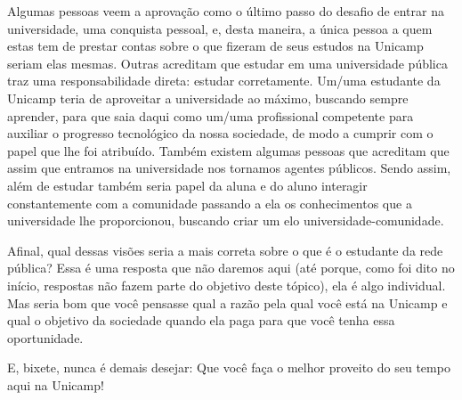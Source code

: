 Algumas pessoas veem a aprovação como o último passo do desafio de entrar na
universidade, uma conquista pessoal, e, desta maneira, a única pessoa a quem
estas tem de prestar contas sobre o que fizeram de seus estudos na Unicamp
seriam elas mesmas. Outras acreditam que estudar em uma universidade pública
traz uma responsabilidade direta: estudar corretamente. Um/uma estudante da
Unicamp teria de aproveitar a universidade ao máximo, buscando sempre aprender,
para que saia daqui como um/uma profissional competente para auxiliar o
progresso tecnológico da nossa sociedade, de modo a cumprir com o papel que lhe
foi atribuído. Também existem algumas pessoas que acreditam que assim que
entramos na universidade nos tornamos agentes públicos. Sendo assim, além de
estudar também seria papel da aluna e do aluno interagir constantemente com a
comunidade passando a ela os conhecimentos que a universidade lhe proporcionou,
buscando criar um elo universidade-comunidade.

Afinal, qual dessas visões seria a mais correta sobre o que é o estudante da
rede pública? Essa é uma resposta que não daremos aqui (até porque, como foi
dito no início, respostas não fazem parte do objetivo deste tópico), ela é algo
individual. Mas seria bom que você pensasse qual a razão pela qual você está na
Unicamp e qual o objetivo da sociedade quando ela paga para que você tenha essa
oportunidade.

E, bixete, nunca é demais desejar: Que você faça o melhor proveito do seu tempo
aqui na Unicamp!
